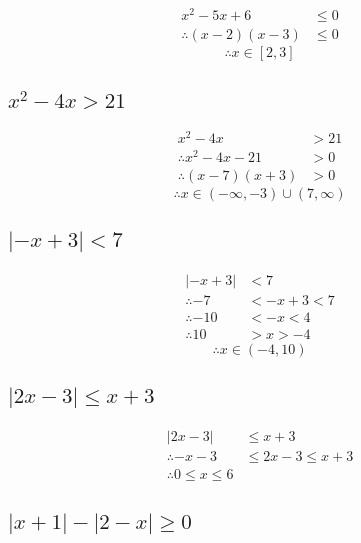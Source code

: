 \documentclass[fleqn, a4paper, 10pt]{article}
\begin{document}
\begin{align*}
	x^2 - 5x + 6 &\leq 0\\
	\therefore (x-2)(x-3) &\leq 0
\end{align*}
\begin{equation*}
	\therefore x \in [2, 3] 
\end{equation*}

\subsection{$x^2 - 4x > 21$}

\begin{align*}
	x^2 - 4x &> 21\\
	\therefore x^2 -4x - 21 &> 0\\
	\therefore (x-7)(x+3) &> 0
\end{align*}
\begin{equation*}
	\therefore x \in (-\infty, -3) \cup (7, \infty)
\end{equation*}

\subsection{$|-x +  3| < 7$}

\begin{align*}
	|-x + 3| &< 7\\
	\therefore -7 &< -x + 3 < 7\\
	\therefore -10 &< -x < 4\\
	\therefore 10 &> x > -4 
\end{align*}
\begin{equation*}
	\therefore x \in (-4, 10)
\end{equation*}

\subsection{$|2x - 3| \leq x+3$}

\begin{align*}
	|2x - 3| &\leq x + 3\\
	\therefore -x - 3 &\leq 2x - 3 \leq x + 3\\
	\therefore 0 \leq x \leq 6
\end{align*}

\subsection{$|x + 1| - |2 - x| \geq 0$}
\end{document}
